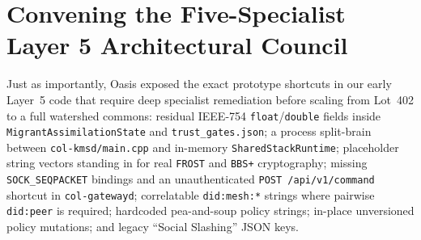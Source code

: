 \section*{Convening the Five-Specialist Layer 5 Architectural Council}

Just as importantly, Oasis exposed the exact prototype shortcuts in our early Layer~5 code that
require deep specialist remediation before scaling from Lot~402 to a full watershed commons:
residual IEEE-754 \texttt{float}/\texttt{double} fields inside \texttt{MigrantAssimilationState}
and \texttt{trust\_gates.json}; a process split-brain between \texttt{col-kmsd/main.cpp} and
in-memory \texttt{SharedStackRuntime}; placeholder string vectors standing in for real
\texttt{FROST} and \texttt{BBS+} cryptography; missing \texttt{SOCK\_SEQPACKET} bindings and an
unauthenticated \texttt{POST /api/v1/command} shortcut in \texttt{col-gatewayd}; correlatable
\texttt{did:mesh:*} strings where pairwise \texttt{did:peer} is required; hardcoded pea-and-soup
policy strings; in-place unversioned policy mutations; and legacy ``Social Slashing'' JSON keys.

